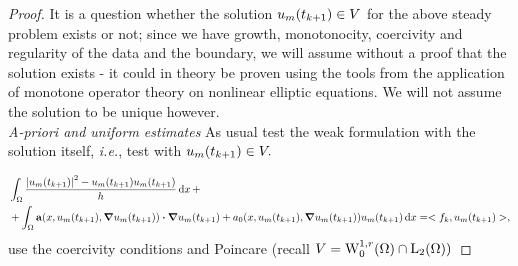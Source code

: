 \documentclass{article}
\begin{document}
\begin{proof}
	It is a question whether the solution $u_m\qty(t_{k+1}) \in V$ for the above steady problem exists or not; since we have growth, monotonocity, coercivity and regularity of the data and the boundary, we will assume without a proof that the solution exists - it could in theory be proven using the tools from the application of monotone operator theory on nonlinear elliptic equations. We will not assume the solution to be unique however.\\

	\textit{A-priori and uniform estimates}
 As usual test the weak formulation with the solution itself, \textit{i.e.}, test with $u_m\qty(t_{k+1}) \in V.$

	\begin{align*}
		&\int_{\Omega}\frac{\abs{u_m\qty(t_{k+1})}^{2} - u_m\qty(t_{k+1})u_{m}\qty(t_{k+1})}{h}\dd{x} + \\
		&+ \int_{\Omega}\vb{a}\qty(x, u_m\qty(t_{k+1}), \grad u_m\qty(t_{k+1}))\vdot \grad u_m\qty(t_{k+1}) + a_0\qty(x, u_m\qty(t_{k+1}), \grad u_m\qty(t_{k+1})) u_m\qty(t_{k+1})\dd{x} = <f_k, u_m\qty(t_{k+1})>,
	\end{align*}
	use the coercivity conditions and Poincare (recall $V = \WkpzeroSet[1][r]{\Omega} \cap \LpSet[2]{\Omega})$


\end{proof}
\end{document}
